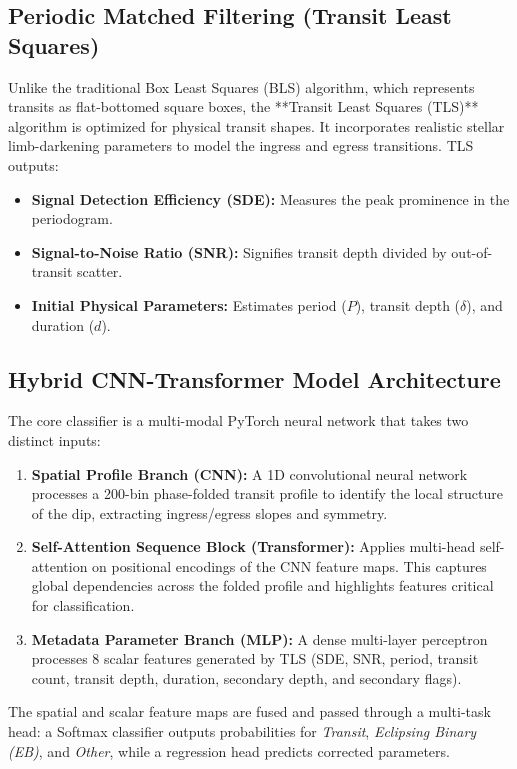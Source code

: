\documentclass[11pt,a4paper]{article}
\begin{document}
\subsection{Periodic Matched Filtering (Transit Least Squares)}
Unlike the traditional Box Least Squares (BLS) algorithm, which represents transits as flat-bottomed square boxes, the **Transit Least Squares (TLS)** algorithm is optimized for physical transit shapes. It incorporates realistic stellar limb-darkening parameters to model the ingress and egress transitions. TLS outputs:
\begin{itemize}
    \item \textbf{Signal Detection Efficiency (SDE):} Measures the peak prominence in the periodogram.
    \item \textbf{Signal-to-Noise Ratio (SNR):} Signifies transit depth divided by out-of-transit scatter.
    \item \textbf{Initial Physical Parameters:} Estimates period ($P$), transit depth ($\delta$), and duration ($d$).
\end{itemize}

\newpage
\clearpage

\subsection{Hybrid CNN-Transformer Model Architecture}
The core classifier is a multi-modal PyTorch neural network that takes two distinct inputs:
\begin{enumerate}
    \item \textbf{Spatial Profile Branch (CNN):} A 1D convolutional neural network processes a 200-bin phase-folded transit profile to identify the local structure of the dip, extracting ingress/egress slopes and symmetry.
    \item \textbf{Self-Attention Sequence Block (Transformer):} Applies multi-head self-attention on positional encodings of the CNN feature maps. This captures global dependencies across the folded profile and highlights features critical for classification.
    \item \textbf{Metadata Parameter Branch (MLP):} A dense multi-layer perceptron processes 8 scalar features generated by TLS (SDE, SNR, period, transit count, transit depth, duration, secondary depth, and secondary flags).
\end{enumerate}
The spatial and scalar feature maps are fused and passed through a multi-task head: a Softmax classifier outputs probabilities for \textit{Transit}, \textit{Eclipsing Binary (EB)}, and \textit{Other}, while a regression head predicts corrected parameters.
\end{document}
